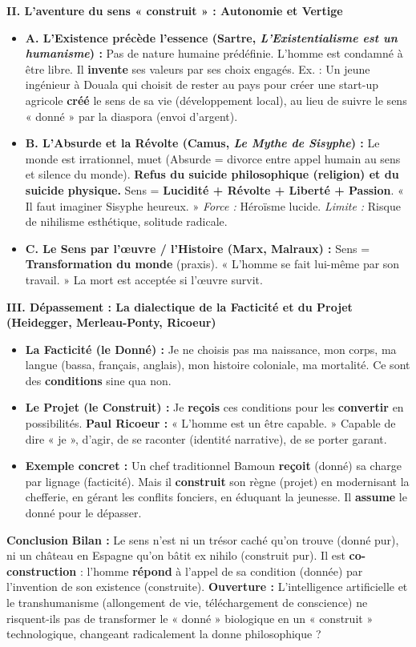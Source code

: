 \documentclass[11pt]{article}
\newcommand{\cle}[1]{{\popxbold\color{popdark}#1}}
\begin{document}
\begin{exoresolu}
\textbf{II. L'aventure du sens « construit » : Autonomie et Vertige}
\begin{itemize}
    \item \textbf{A. L'Existence précède l'essence (Sartre, \emph{L'Existentialisme est un humanisme}) :} Pas de nature humaine prédéfinie. L'homme est \cle{condamné à être libre}. Il \textbf{invente} ses valeurs par ses choix engagés. Ex. : Un jeune ingénieur à Douala qui choisit de rester au pays pour créer une start-up agricole \textbf{créé} le sens de sa vie (développement local), au lieu de suivre le sens « donné » par la diaspora (envoi d'argent).
    \item \textbf{B. L'Absurde et la Révolte (Camus, \emph{Le Mythe de Sisyphe}) :} Le monde est irrationnel, muet (Absurde = divorce entre appel humain au sens et silence du monde). \textbf{Refus du suicide philosophique (religion) et du suicide physique.} Sens = \textbf{Lucidité + Révolte + Liberté + Passion}. « Il faut imaginer Sisyphe heureux. » \textit{Force :} Héroïsme lucide. \textit{Limite :} Risque de nihilisme esthétique, solitude radicale.
    \item \textbf{C. Le Sens par l'œuvre / l'Histoire (Marx, Malraux) :} Sens = \textbf{Transformation du monde} (praxis). « L'homme se fait lui-même par son travail. » La mort est acceptée si l'œuvre survit.
\end{itemize}

\textbf{III. Dépassement : La dialectique de la Facticité et du Projet (Heidegger, Merleau-Ponty, Ricoeur)}
\begin{itemize}
    \item \textbf{La Facticité (le Donné) :} Je ne choisis pas ma naissance, mon corps, ma langue (bassa, français, anglais), mon histoire coloniale, ma mortalité. Ce sont des \textbf{conditions} sine qua non.
    \item \textbf{Le Projet (le Construit) :} Je \textbf{reçois} ces conditions pour les \textbf{convertir} en possibilités. \textbf{Paul Ricoeur :} « L'homme est un être capable. » Capable de dire « je », d'agir, de se raconter (identité narrative), de se porter garant.
    \item \textbf{Exemple concret :} Un chef traditionnel Bamoun \textbf{reçoit} (donné) sa charge par lignage (facticité). Mais il \textbf{construit} son règne (projet) en modernisant la chefferie, en gérant les conflits fonciers, en éduquant la jeunesse. Il \textbf{assume} le donné pour le dépasser.
\end{itemize}

\textbf{Conclusion}
\textbf{Bilan :} Le sens n'est ni un trésor caché qu'on trouve (donné pur), ni un château en Espagne qu'on bâtit ex nihilo (construit pur). Il est \textbf{co-construction} : l'homme \textbf{répond} à l'appel de sa condition (donnée) par l'invention de son existence (construite).
\textbf{Ouverture :} L'intelligence artificielle et le transhumanisme (allongement de vie, téléchargement de conscience) ne risquent-ils pas de transformer le « donné » biologique en un « construit » technologique, changeant radicalement la donne philosophique ?
\end{exoresolu}
\end{document}
